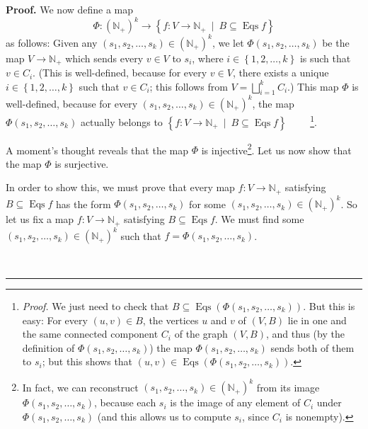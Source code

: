 \documentclass[numbers=enddot,12pt,final,onecolumn,notitlepage]{scrartcl}%
\theoremstyle{definition}
\newenvironment{proof}[1][Proof]{\noindent\textbf{#1.} }{\ \rule{0.5em}{0.5em}}
\newenvironment{vershort}{}{}
\begin{document}
\begin{vershort}
\begin{proof}
We now define a map%
\[
\Phi:\left(  \mathbb{N}_{+}\right)  ^{k}\rightarrow\left\{  f:V\rightarrow
\mathbb{N}_{+}\ \mid\ B\subseteq\operatorname*{Eqs}f\right\}
\]
as follows: Given any $\left(  s_{1},s_{2},\ldots,s_{k}\right)  \in\left(
\mathbb{N}_{+}\right)  ^{k}$, we let $\Phi\left(  s_{1},s_{2},\ldots
,s_{k}\right)  $ be the map $V\rightarrow\mathbb{N}_{+}$ which sends every
$v\in V$ to $s_{i}$, where $i\in\left\{  1,2,\ldots,k\right\}  $ is such that
$v\in C_{i}$. (This is well-defined, because for every $v\in V$, there exists
a unique $i\in\left\{  1,2,\ldots,k\right\}  $ such that $v\in C_{i}$; this
follows from $V=\bigsqcup_{i=1}^{k}C_{i}$.) This map $\Phi$ is well-defined,
because for every $\left(  s_{1},s_{2},\ldots,s_{k}\right)  \in\left(
\mathbb{N}_{+}\right)  ^{k}$, the map $\Phi\left(  s_{1},s_{2},\ldots
,s_{k}\right)  $ actually belongs to $\left\{  f:V\rightarrow\mathbb{N}%
_{+}\ \mid\ B\subseteq\operatorname*{Eqs}f\right\}  $%
\ \ \ \ \footnote{\textit{Proof.} We just need to check that $B\subseteq
\operatorname*{Eqs}\left(  \Phi\left(  s_{1},s_{2},\ldots,s_{k}\right)
\right)  $. But this is easy: For every $\left(  u,v\right)  \in B$, the
vertices $u$ and $v$ of $\left(  V,B\right)  $ lie in one and the same
connected component $C_{i}$ of the graph $\left(  V,B\right)  $, and thus (by
the definition of $\Phi\left(  s_{1},s_{2},\ldots,s_{k}\right)  $) the map
$\Phi\left(  s_{1},s_{2},\ldots,s_{k}\right)  $ sends both of them to $s_{i}$;
but this shows that $\left(  u,v\right)  \in\operatorname*{Eqs}\left(
\Phi\left(  s_{1},s_{2},\ldots,s_{k}\right)  \right)  $.}.

A moment's thought reveals that the map $\Phi$ is injective\footnote{In fact,
we can reconstruct $\left(  s_{1},s_{2},\ldots,s_{k}\right)  \in\left(
\mathbb{N}_{+}\right)  ^{k}$ from its image $\Phi\left(  s_{1},s_{2}%
,\ldots,s_{k}\right)  $, because each $s_{i}$ is the image of any element of
$C_{i}$ under $\Phi\left(  s_{1},s_{2},\ldots,s_{k}\right)  $ (and this allows
us to compute $s_{i}$, since $C_{i}$ is nonempty).}. Let us now show that the
map $\Phi$ is surjective.

In order to show this, we must prove that every map $f:V\rightarrow
\mathbb{N}_{+}$ satisfying $B\subseteq\operatorname*{Eqs}f$ has the form
$\Phi\left(  s_{1},s_{2},\ldots,s_{k}\right)  $ for some $\left(  s_{1}%
,s_{2},\ldots,s_{k}\right)  \in\left(  \mathbb{N}_{+}\right)  ^{k}$. So let us
fix a map $f:V\rightarrow\mathbb{N}_{+}$ satisfying $B\subseteq
\operatorname*{Eqs}f$. We must find some $\left(  s_{1},s_{2},\ldots
,s_{k}\right)  \in\left(  \mathbb{N}_{+}\right)  ^{k}$ such that
$f=\Phi\left(  s_{1},s_{2},\ldots,s_{k}\right)  $.


\end{proof}
\end{vershort}
\end{document}
